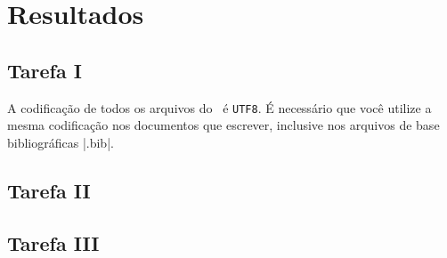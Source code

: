 

\chapter{Resultados}

\section{Tarefa I}

A codifica\c{c}\~{a}o de todos os arquivos do \abnTeX\ \'{e} \texttt{UTF8}. \'{E} necess\'{a}rio que
voc\^{e} utilize a mesma codifica\c{c}\~{a}o nos documentos que escrever, inclusive nos
arquivos de base bibliogr\'{a}ficas |.bib|.


\section{Tarefa II}


\section{Tarefa III}


